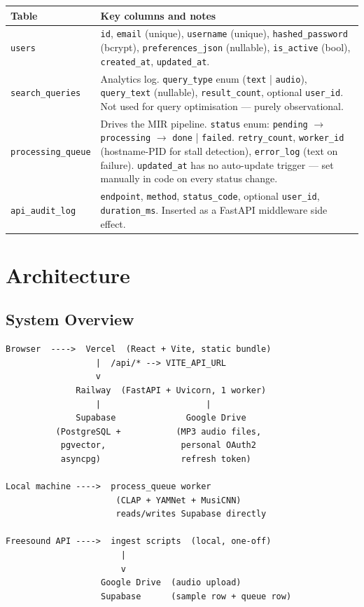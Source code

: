 \documentclass[12pt,letterpaper]{report}
\begin{document}
\begin{center}
\begin{tabularx}{\textwidth}{lX}
\toprule
\textbf{Table} & \textbf{Key columns and notes} \\
\midrule
\texttt{users}
  & \texttt{id}, \texttt{email} (unique), \texttt{username} (unique),
    \texttt{hashed\_password} (bcrypt), \texttt{preferences\_json} (nullable),
    \texttt{is\_active} (bool), \texttt{created\_at}, \texttt{updated\_at}. \\
\addlinespace
\texttt{search\_queries}
  & Analytics log.
    \texttt{query\_type} enum (\texttt{text} | \texttt{audio}),
    \texttt{query\_text} (nullable), \texttt{result\_count},
    optional \texttt{user\_id}. Not used for query optimisation --- purely
    observational. \\
\addlinespace
\texttt{processing\_queue}
  & Drives the MIR pipeline.
    \texttt{status} enum: \texttt{pending} $\to$ \texttt{processing} $\to$
    \texttt{done} | \texttt{failed}. \texttt{retry\_count}, \texttt{worker\_id}
    (hostname-PID for stall detection), \texttt{error\_log} (text on failure).
    \texttt{updated\_at} has no auto-update trigger --- set manually in code on
    every status change. \\
\addlinespace
\texttt{api\_audit\_log}
  & \texttt{endpoint}, \texttt{method}, \texttt{status\_code}, optional
    \texttt{user\_id}, \texttt{duration\_ms}. Inserted as a FastAPI middleware
    side effect. \\
\bottomrule
\end{tabularx}
\end{center}

\chapter{Architecture}

\section{System Overview}

\begin{lstlisting}[style=bashstyle,
  caption={High-level deployment topology},
  label={lst:topology}]
Browser  ---->  Vercel  (React + Vite, static bundle)
                  |  /api/* --> VITE_API_URL
                  v
              Railway  (FastAPI + Uvicorn, 1 worker)
                  |                     |
              Supabase              Google Drive
          (PostgreSQL +           (MP3 audio files,
           pgvector,               personal OAuth2
           asyncpg)                refresh token)

Local machine ---->  process_queue worker
                      (CLAP + YAMNet + MusiCNN)
                      reads/writes Supabase directly

Freesound API ---->  ingest scripts  (local, one-off)
                       |
                       v
                   Google Drive  (audio upload)
                   Supabase      (sample row + queue row)
\end{lstlisting}
\end{document}
